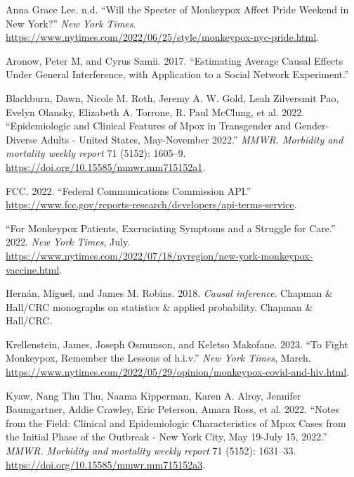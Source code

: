 \documentclass[
  letterpaper,
  DIV=11,
  numbers=noendperiod,
  oneside]{scrreprt}
\newlength{\cslhangindent}
\newlength{\cslentryspacingunit} %
\newenvironment{CSLReferences}[2] %
 {%
  \setlength{\parindent}{0pt}
  \ifodd #1
  \let\oldpar\par
  \def\par{\hangindent=\cslhangindent\oldpar}
  \fi
  \setlength{\parskip}{#2\cslentryspacingunit}
 }%
 {}
\begin{document}
\hypertarget{refs}{}
\begin{CSLReferences}{1}{0}
\leavevmode{}%
Anna Grace Lee. n.d. {``Will the Specter of Monkeypox Affect Pride
Weekend in New York?''} \emph{New York Times}.
\url{https://www.nytimes.com/2022/06/25/style/monkeypox-nyc-pride.html}.

\leavevmode{}%
Aronow, Peter M, and Cyrus Samii. 2017. {``Estimating Average Causal
Effects Under General Interference, with Application to a Social Network
Experiment.''}

\leavevmode{}%
Blackburn, Dawn, Nicole M. Roth, Jeremy A. W. Gold, Leah Zilversmit Pao,
Evelyn Olansky, Elizabeth A. Torrone, R. Paul McClung, et al. 2022.
{``Epidemiologic and Clinical Features of Mpox in Transgender and
Gender-Diverse Adults - United States, May-November 2022.''} \emph{MMWR.
Morbidity and mortality weekly report} 71 (5152): 1605--9.
\url{https://doi.org/10.15585/mmwr.mm715152a1}.

\leavevmode{}%
FCC. 2022. {``Federal Communications Commission API.''}
\url{https://www.fcc.gov/reports-research/developers/api-terms-service}.

\leavevmode{}%
{``For Monkeypox Patients, Excruciating Symptoms and a Struggle for
Care.''} 2022. \emph{New York Times}, July.
\url{https://www.nytimes.com/2022/07/18/nyregion/new-york-monkeypox-vaccine.html}.

\leavevmode{}%
Hernán, Miguel, and James M. Robins. 2018. \emph{Causal inference}.
Chapman \& Hall/CRC monographs on statistics \& applied probability.
Chapman \& Hall/CRC.

\leavevmode{}%
Krellenstein, James, Joseph Osmunson, and Keletso Makofane. 2023. {``To
Fight Monkeypox, Remember the Lessons of h.i.v.''} \emph{New York
Times}, March.
\url{https://www.nytimes.com/2022/05/29/opinion/monkeypox-covid-and-hiv.html}.

\leavevmode{}%
Kyaw, Nang Thu Thu, Naama Kipperman, Karen A. Alroy, Jennifer
Baumgartner, Addie Crawley, Eric Peterson, Amara Ross, et al. 2022.
{``Notes from the Field: Clinical and Epidemiologic Characteristics of
Mpox Cases from the Initial Phase of the Outbreak - New York City, May
19-July 15, 2022.''} \emph{MMWR. Morbidity and mortality weekly report}
71 (5152): 1631--33. \url{https://doi.org/10.15585/mmwr.mm715152a3}.


\end{CSLReferences}
\end{document}
